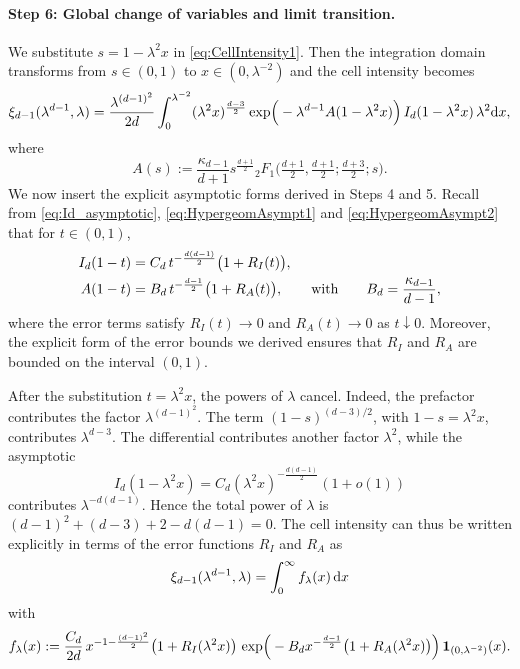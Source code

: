 \documentclass[11pt,a4paper]{article}
\theoremstyle{plain}
\theoremstyle{definition}
\theoremstyle{remark}
\newcommand{\dint}{\textup{d}}
\begin{document}
\paragraph{Step 6: Global change of variables and limit transition.}
We substitute $s = 1 - \lambda^2 x$ in \eqref{eq:CellIntensity1}. Then the integration domain transforms from $s \in (0,1)$ to $x \in (0, \lambda^{-2})$ and the cell intensity becomes
\[
	\xi_{d-1}(\lambda^{d-1}, \lambda) = \frac{\lambda^{(d-1)^2}}{2d} \int_0^{\lambda^{-2}} (\lambda^2 x)^{\frac{d-3}{2}} \exp\!\Big( - \lambda^{d-1} A(1-\lambda^2 x) \Big) \, I_d(1-\lambda^2 x) \, \lambda^2 \dint x,
\]
where
\begin{equation}\label{eq:A}
	A(s) := \frac{\kappa_{d-1}}{d+1} s^{\frac{d+1}{2}}
		{}_2F_1\!\Big(\tfrac{d+1}{2},\tfrac{d+1}{2};\tfrac{d+3}{2};s\Big).
\end{equation}
We now insert the explicit asymptotic forms derived in Steps 4 and 5. Recall from \eqref{eq:Id_asymptotic}, \eqref{eq:HypergeomAsympt1} and \eqref{eq:HypergeomAsympt2} that for $t \in (0,1)$,
\begin{align}
	I_d(1-t) & = C_d \, t^{-\frac{d(d-1)}{2}} \big(1 + R_I(t)\big),  \notag                                                                   \\
	A(1-t)   & = B_d \, t^{-\frac{d-1}{2}} \big(1 + R_A(t)\big), \qquad \text{with}\qquad B_d = \frac{\kappa_{d-1}}{d-1},\label{eq:Aestimate}
\end{align}
where the error terms satisfy $R_I(t) \to 0$ and $R_A(t) \to 0$ as $t \downarrow 0$. Moreover, the explicit form of the error bounds we derived ensures that $R_I$ and $R_A$ are bounded on the interval $(0,1)$.

After the substitution $t=\lambda^2 x$, the powers of $\lambda$ cancel.
Indeed, the prefactor contributes the factor $\lambda^{(d-1)^2}$. The term
$(1-s)^{(d-3)/2}$, with $1-s=\lambda^2 x$, contributes
$\lambda^{d-3}$. The differential contributes another factor
$\lambda^2$, while the asymptotic
\[
	I_d(1-\lambda^2 x)
	=
	C_d(\lambda^2 x)^{-\frac{d(d-1)}2}(1+o(1))
\]
contributes $\lambda^{-d(d-1)}$. Hence the total power of $\lambda$ is $(d-1)^2+(d-3)+2-d(d-1)=0$.
The cell intensity can thus be written explicitly in terms of the error functions $R_I$ and $R_A$ as
\begin{equation}\label{eq:CellIntensityIntegral}
	\xi_{d-1}(\lambda^{d-1}, \lambda) = \int_0^{\infty} f_\lambda(x) \,\dint x
\end{equation}
with
\[
	f_\lambda(x) := \frac{C_d}{2d} \, x^{-1 - \frac{(d-1)^2}{2}} \big(1 + R_I(\lambda^2 x)\big) \, \exp\!\Big( - B_d x^{-\frac{d-1}{2}} \big(1 + R_A(\lambda^2 x)\big) \Big) \, {\bf 1}_{(0, \lambda^{-2})}(x).
\]
\end{document}
